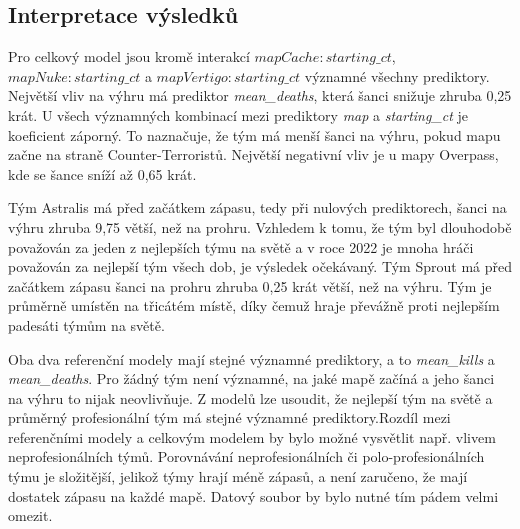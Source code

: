 \subsection{Interpretace výsledků}
Pro celkový model jsou kromě interakcí $mapCache:starting\_ct$, $mapNuke:starting\_ct$ a $mapVertigo:starting\_ct$ významné všechny prediktory. Největší vliv na výhru má
prediktor \textit{mean\_deaths}, která šanci snižuje zhruba 0,25 krát. U všech významných kombinací mezi prediktory \textit{map} a \textit{starting\_ct} je koeficient
záporný. To naznačuje, že tým má menší šanci na výhru, pokud mapu začne na straně Counter-Terroristů. Největší negativní vliv je u mapy Overpass, kde se šance
sníží až 0,65 krát.

Tým Astralis má před začátkem zápasu, tedy při nulových prediktorech, šanci na výhru zhruba 9,75 větší, než na prohru. Vzhledem k tomu, že tým byl dlouhodobě považován
za jeden z nejlepších týmu na světě a v roce 2022 je mnoha hráči považován za nejlepší tým všech dob, je výsledek očekávaný. Tým Sprout má před začátkem zápasu 
šanci na prohru zhruba 0,25 krát větší, než na výhru. Tým je průměrně umístěn na třicátém místě, díky čemuž hraje převážně proti nejlepším padesáti týmům na světě.

Oba dva referenční modely mají stejné významné prediktory, a to \textit{mean\_kills} a \textit{mean\_deaths}. Pro žádný tým není významné, na jaké mapě začíná a jeho šanci
na výhru to nijak neovlivňuje. Z modelů lze usoudit, že nejlepší tým na světě a průměrný profesionální tým má stejné významné prediktory.Rozdíl mezi referenčními modely a 
celkovým modelem by bylo možné vysvětlit např. vlivem neprofesionálních týmů. Porovnávání neprofesionálních či polo-profesionálních týmu je složitější, jelikož týmy 
hrají méně zápasů, a není zaručeno, že mají dostatek zápasu na každé mapě. Datový soubor by bylo nutné tím pádem velmi omezit.